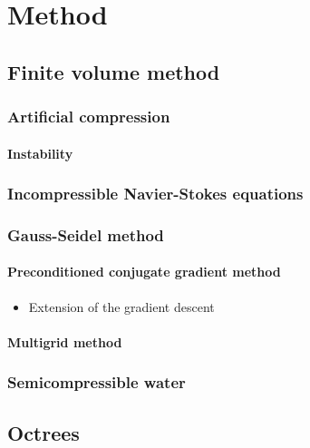 \documentclass[a4paper]{report}
\begin{document}

\part{Method}

\chapter{Finite volume method}

\section{Artificial compression}

\subsection{Instability}

\section{Incompressible Navier-Stokes equations}

\section{Gauss-Seidel method}

\subsection{Preconditioned conjugate gradient method}

\begin{itemize}
    \item Extension of the gradient descent
\end{itemize}

\subsection{Multigrid method}

\section{Semicompressible water}

\chapter{Octrees}
\end{document}
